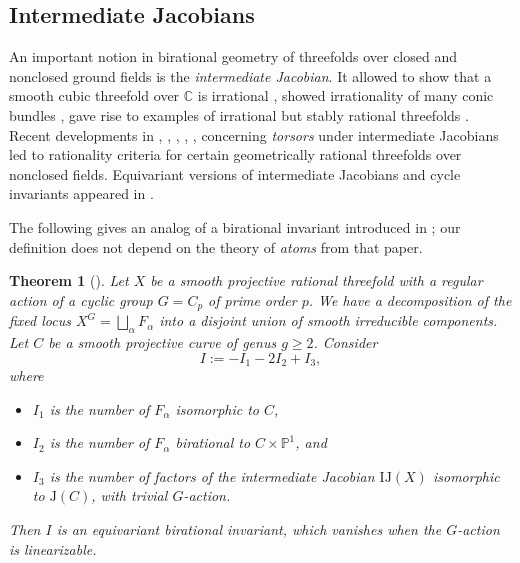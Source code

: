 \documentclass[12pt,reqno]{amsart}
\theoremstyle{plain}
\newtheorem{theo}[prop]{Theorem}
\theoremstyle{remark}
\theoremstyle{definition}
\numberwithin{equation}{section}
\newcommand{\bP}{{\mathbb P}}
\newcommand{\iJ}{{\mathrm{IJ}}}
\newcommand{\bC}{{\mathbb C}}
\begin{document}
\subsection{Intermediate Jacobians}
\label{sect:jac}
An important notion in birational geometry of threefolds over closed and nonclosed ground fields is the {\em intermediate Jacobian}. It allowed to show that a smooth cubic threefold over $\bC$ is irrational \cite{CG}, showed irrationality of many conic bundles \cite{Beau}, gave rise to examples of irrational but stably rational threefolds \cite{BCSS}. Recent developments in \cite{BW1}, \cite{HT-cycle}, \cite{HT-rat}, \cite{BW2}, \cite{KuP1}, \cite{KuP2} concerning {\em torsors} under intermediate Jacobians
led to rationality criteria for certain geometrically rational threefolds over nonclosed fields. Equivariant versions of intermediate Jacobians and cycle invariants appeared in \cite{HT-quad}. 

The following gives an analog of a birational invariant introduced in \cite[Thm.\ 3.6]{CKK}; our definition does not depend on the theory of {\em atoms} from that paper.  

\begin{theo}[{\cite[Prop.\ 5.2]{KTT}}]
\label{thm:new}
Let $X$ be a smooth projective rational threefold with a regular action of a cyclic group $G=C_p$ of prime order $p$.  
We have a decomposition of the fixed locus $X^G=\bigsqcup_{\alpha} F_{\alpha}$ into a disjoint union of smooth irreducible components. Let $C$ be a smooth projective curve of genus $g\ge 2$. 
Consider
\begin{equation} 
\label{eqn:I}
I:=-I_1-2I_2+I_3, 
\end{equation}
where 
\begin{itemize}
\item $I_1$ is the number of $F_{\alpha}$ isomorphic to $C$, 
\item $I_2$ is the number of $F_{\alpha}$ birational to $C\times \bP^1$, and 
\item $I_3$ is the number of factors of the intermediate Jacobian $\iJ(X)$ isomorphic to $\mathrm{J}(C)$, with trivial $G$-action. 
\end{itemize}
Then $I$ is an equivariant birational invariant, which vanishes when the $G$-action is linearizable. 
\end{theo}
\end{document}
